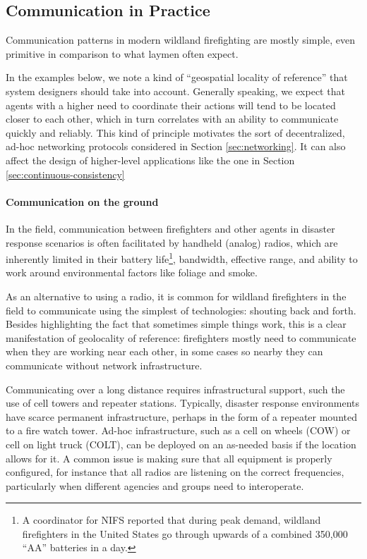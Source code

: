\documentclass[]             %
{NASA}                       %
\theoremstyle{definition}
\begin{document}
\subsection{Communication in Practice}\label{communication-in-practice}

Communication patterns in modern wildland firefighting are mostly
simple, even primitive in comparison to what laymen often expect.

In the examples below, we note a kind of ``geospatial locality of
reference'' that system designers should take into account. Generally
speaking, we expect that agents with a higher need to coordinate their
actions will tend to be located closer to each other, which in turn
correlates with an ability to communicate quickly and reliably. This
kind of principle motivates the sort of decentralized, ad-hoc networking
protocols considered in Section \ref{sec:networking}. It can also affect
the design of higher-level applications like the one in Section
\ref{sec:continuous-consistency}

\paragraph{Communication on the ground}

In the field, communication between firefighters and other agents in
disaster response scenarios is often facilitated by handheld (analog)
radios, which are inherently limited in their battery life\footnote{A
  coordinator for NIFS reported that during peak demand, wildland
  firefighters in the United States go through upwards of a combined
  350,000 ``AA'' batteries in a day.}, bandwidth, effective range, and
ability to work around environmental factors like foliage and smoke.

As an alternative to using a radio, it is common for wildland
firefighters in the field to communicate using the simplest of
technologies: shouting back and forth. Besides highlighting the fact
that sometimes simple things work, this is a clear manifestation of
geolocality of reference: firefighters mostly need to communicate when
they are working near each other, in some cases so nearby they can
communicate without network infrastructure.

Communicating over a long distance requires infrastructural support,
such the use of cell towers and repeater stations. Typically, disaster
response environments have scarce permanent infrastructure, perhaps in
the form of a repeater mounted to a fire watch tower. Ad-hoc
infrastructure, such as a cell on wheels (COW) or cell on light truck
(COLT), can be deployed on an as-needed basis if the location allows for
it. A common issue is making sure that all equipment is properly
configured, for instance that all radios are listening on the correct
frequencies, particularly when different agencies and groups need to
interoperate.
\end{document}
